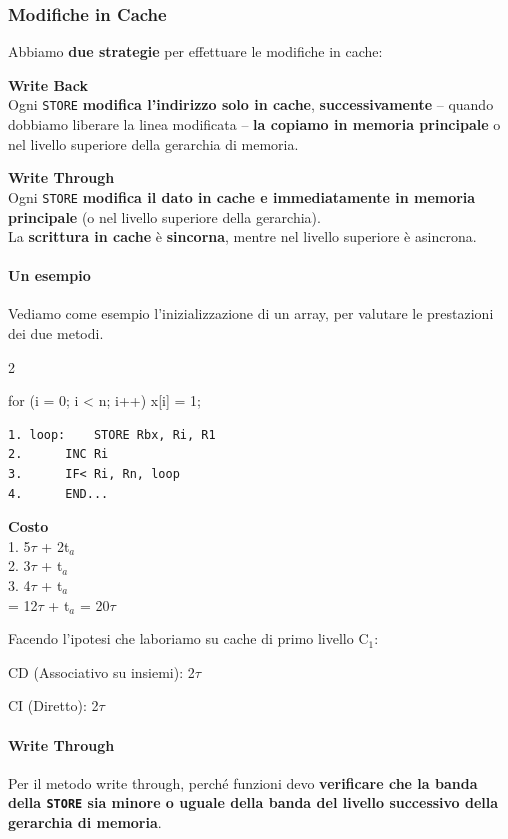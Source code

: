 \documentclass[10pt]{report}
\begin{document}
\subsubsection{Modifiche in Cache}
Abbiamo \textbf{due strategie} per effettuare le modifiche in cache:
\begin{list}{}{}
	\item \textbf{Write Back}\\
	Ogni \texttt{STORE} \textbf{modifica l'indirizzo solo in cache}, \textbf{successivamente} -- quando dobbiamo liberare la linea modificata -- \textbf{la copiamo in memoria principale} o nel livello superiore della gerarchia di memoria.
	\item \textbf{Write Through}\\
	Ogni \texttt{STORE} \textbf{modifica il dato in cache e immediatamente in memoria principale} (o nel livello superiore della gerarchia).\\
	La \textbf{scrittura in cache} è \textbf{sincorna}, mentre nel livello superiore è asincrona.
\end{list}
\pagebreak
\paragraph{Un esempio} Vediamo come esempio l'inizializzazione di un array, per valutare le prestazioni dei due metodi.
\begin{multicols}{2}
\begin{C}
for (i = 0; i < n; i++) x[i] = 1;
\end{C}
\begin{lstlisting}
1. loop:	STORE Rbx, Ri, R1
2.		INC Ri
3.		IF< Ri, Rn, loop
4.		END...
\end{lstlisting}
\columnbreak
\textbf{Costo}\\
	1. 5$\tau$ + 2t$_a$\\
	2. 3$\tau$ + t$_a$\\
	3. 4$\tau$ + t$_a$\\
	= 12$\tau$ + t$_a$ = 20$\tau$
\end{multicols}
\begin{list}{}{Facendo l'ipotesi che laboriamo su cache di primo livello C$_1$:}
	\item CD (Associativo su insiemi): 2$\tau$
	\item CI (Diretto): 2$\tau$
\end{list}
\paragraph{Write Through} Per il metodo write through, perché funzioni devo \textbf{verificare che la banda della \texttt{STORE} sia minore o uguale della banda del livello successivo della gerarchia di memoria}.
\end{document}
